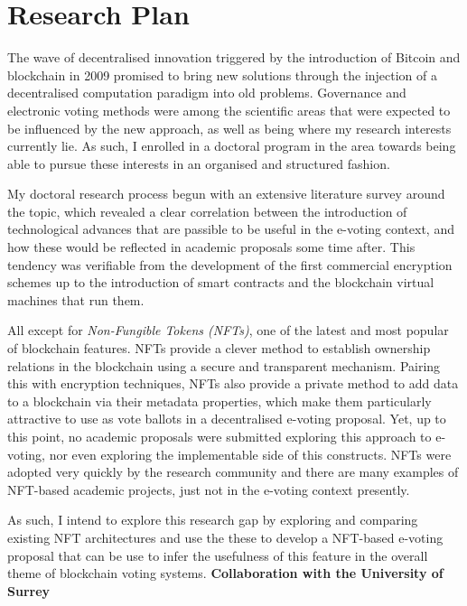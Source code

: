 \documentclass[../main.tex]{subfiles}
\begin{document}
\section{Research Plan}
\label{sec:research_plan}
The wave of decentralised innovation triggered by the introduction of Bitcoin and blockchain in 2009 promised to bring new solutions through the injection of a decentralised computation paradigm into old problems. Governance and electronic voting methods were among the scientific areas that were expected to be influenced by the new approach, as well as being where my research interests currently lie. As such, I enrolled in a doctoral program in the area towards being able to pursue these interests in an organised and structured fashion.
\par
My doctoral research process begun with an extensive literature survey around the topic, which revealed a clear correlation between the introduction of technological advances that are passible to be useful in the e-voting context, and how these would be reflected in academic proposals some time after. This tendency was verifiable from the development of the first commercial encryption schemes up to the introduction of smart contracts and the blockchain virtual machines that run them.
\par
All except for \textit{Non-Fungible Tokens (NFTs)}, one of the latest and most popular of blockchain features. NFTs provide a clever method to establish ownership relations in the blockchain using a secure and transparent mechanism. Pairing this with encryption techniques, NFTs also provide a private method to add data to a blockchain via their metadata properties, which make them particularly attractive to use as vote ballots in a decentralised e-voting proposal. Yet, up to this point, no academic proposals were submitted exploring this approach to e-voting, nor even exploring the implementable side of this constructs. NFTs were adopted very quickly by the research community and there are many examples of NFT-based academic projects, just not in the e-voting context presently.
\par
As such, I intend to explore this research gap by exploring and comparing existing NFT architectures and use the these to develop a NFT-based e-voting proposal that can be use to infer the usefulness of this feature in the overall theme of blockchain voting systems.
\vspace{3mm}
\textbf{Collaboration with the University of Surrey}
\vspace{3mm}
\par
\end{document}
